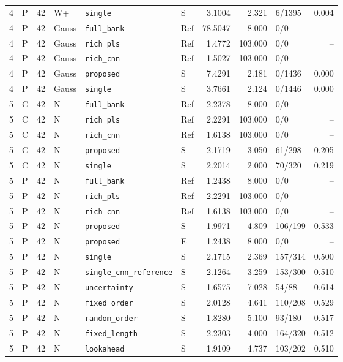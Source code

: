 \documentclass[10pt,a4paper]{article}
\begin{document}
\begin{longtable}{rlrlllrrlr}
4 & P & 42 & W+ & \texttt{single} & S & 3.1004 & 2.321 & 6/1395 & 0.004 \\
4 & P & 42 & Gauss & \texttt{full\_bank} & Ref & 78.5047 & 8.000 & 0/0 & -- \\
4 & P & 42 & Gauss & \texttt{rich\_pls} & Ref & 1.4772 & 103.000 & 0/0 & -- \\
4 & P & 42 & Gauss & \texttt{rich\_cnn} & Ref & 1.5027 & 103.000 & 0/0 & -- \\
4 & P & 42 & Gauss & \texttt{proposed} & S & 7.4291 & 2.181 & 0/1436 & 0.000 \\
4 & P & 42 & Gauss & \texttt{single} & S & 3.7661 & 2.124 & 0/1446 & 0.000 \\
5 & C & 42 & N & \texttt{full\_bank} & Ref & 2.2378 & 8.000 & 0/0 & -- \\
5 & C & 42 & N & \texttt{rich\_pls} & Ref & 2.2291 & 103.000 & 0/0 & -- \\
5 & C & 42 & N & \texttt{rich\_cnn} & Ref & 1.6138 & 103.000 & 0/0 & -- \\
5 & C & 42 & N & \texttt{proposed} & S & 2.1719 & 3.050 & 61/298 & 0.205 \\
5 & C & 42 & N & \texttt{single} & S & 2.2014 & 2.000 & 70/320 & 0.219 \\
5 & P & 42 & N & \texttt{full\_bank} & Ref & 1.2438 & 8.000 & 0/0 & -- \\
5 & P & 42 & N & \texttt{rich\_pls} & Ref & 2.2291 & 103.000 & 0/0 & -- \\
5 & P & 42 & N & \texttt{rich\_cnn} & Ref & 1.6138 & 103.000 & 0/0 & -- \\
5 & P & 42 & N & \texttt{proposed} & S & 1.9971 & 4.809 & 106/199 & 0.533 \\
5 & P & 42 & N & \texttt{proposed} & E & 1.2438 & 8.000 & 0/0 & -- \\
5 & P & 42 & N & \texttt{single} & S & 2.1715 & 2.369 & 157/314 & 0.500 \\
5 & P & 42 & N & \texttt{single\_cnn\_reference} & S & 2.1264 & 3.259 & 153/300 & 0.510 \\
5 & P & 42 & N & \texttt{uncertainty} & S & 1.6575 & 7.028 & 54/88 & 0.614 \\
5 & P & 42 & N & \texttt{fixed\_order} & S & 2.0128 & 4.641 & 110/208 & 0.529 \\
5 & P & 42 & N & \texttt{random\_order} & S & 1.8280 & 5.100 & 93/180 & 0.517 \\
5 & P & 42 & N & \texttt{fixed\_length} & S & 2.2303 & 4.000 & 164/320 & 0.512 \\
5 & P & 42 & N & \texttt{lookahead} & S & 1.9109 & 4.737 & 103/202 & 0.510 \\

\end{longtable}
\end{document}
